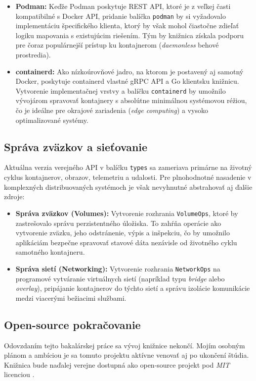 \documentclass[
 program=infpvs,
  language=slovak,
  figures=false,
  tables=false,
  sourcecodes,
  glossaries,
  index
]{kidiplom}
\begin{document}
{\begin{itemize}
    \item \textbf{Podman:} Keďže Podman poskytuje REST API, ktoré je z veľkej časti kompatibilné s Docker API, pridanie balíčka \texttt{podman} by si vyžadovalo implementáciu špecifického klienta, ktorý by však mohol čiastočne zdieľať logiku mapovania s existujúcim riešením. Tým by knižnica získala podporu pre čoraz populárnejší prístup ku kontajnerom (\textit{daemonless} behové prostredia).
    \item \textbf{containerd:} Ako nízkoúrovňové jadro, na ktorom je postavený aj samotný Docker, poskytuje containerd vlastné gRPC API a Go klientsku knižnicu. Vytvorenie implementačnej vrstvy a balíčku \texttt{containerd} by umožnilo vývojárom spravovať kontajnery s absolútne minimálnou systémovou réžiou, čo je ideálne pre okrajové zariadenia (\textit{edge computing}) a vysoko optimalizované systémy.
\end{itemize}



\subsection{Správa zväzkov a sieťovanie}  \label{sec:zvazky-sietovanie}
Aktuálna verzia verejného API v balíčku \texttt{types} sa zameriava primárne na životný cyklus kontajnerov, obrazov, telemetriu a udalosti. Pre plnohodnotné nasadenie v komplexných distribuovaných systémoch je však nevyhnutné abstrahovať aj ďalšie zdroje:

\begin{itemize}
    \item \textbf{Správa zväzkov (Volumes):} Vytvorenie rozhrania \texttt{VolumeOps}, ktoré by zastrešovalo správu perzistentného úložiska. To zahŕňa operácie ako vytvorenie zväzku, jeho odstránenie, výpis a inšpekciu, čo by umožnilo aplikáciám bezpečne spravovať stavové dáta nezávisle od životného cyklu samotného kontajneru.
    \item \textbf{Správa sietí (Networking):} Vytvorenie rozhrania \texttt{NetworkOps} na programové vytváranie virtuálnych sietí (napríklad typu \textit{bridge} alebo \textit{overlay}), pripájanie kontajnerov do týchto sietí a správu izolácie komunikácie medzi viacerými bežiacimi službami.
\end{itemize}



\subsection{Open-source pokračovanie}  \label{sec:open-source}
Odovzdaním tejto bakalárskej práce sa vývoj knižnice nekončí. Mojím osobným plánom a ambíciou je sa tomuto projektu aktívne venovať aj po ukončení štúdia. Knižnica bude naďalej verejne dostupná ako open-source projekt pod \textit{MIT} licenciou \cite{mit-lic}.

}
\end{document}
